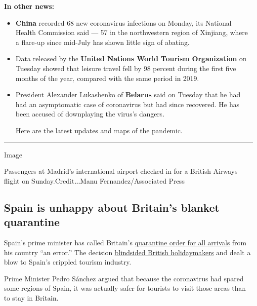 \textbf{In other news:}

\begin{itemize}
\item
  \textbf{China} recorded 68 new coronavirus infections on Monday, its
  National Health Commission said --- 57 in the northwestern region of
  Xinjiang, where a flare-up since mid-July has shown little sign of
  abating.
\item
  Data released by the \textbf{United Nations World Tourism
  Organization} on Tuesday showed that leisure travel fell by 98 percent
  during the first five months of the year, compared with the same
  period in 2019.
\item
  President Alexander Lukashenko of \textbf{Belarus} said on Tuesday
  that he had had an asymptomatic case of coronavirus but had since
  recovered. He has been accused of downplaying the virus's dangers.

  Here are
  \href{https://www.nytimes.com/2020/07/28/world/coronavirus-covid-19.html}{the
  latest updates} and
  \href{https://www.nytimes.com/interactive/2020/world/coronavirus-maps.html}{maps
  of the pandemic}.
\end{itemize}

\begin{center}\rule{0.5\linewidth}{\linethickness}\end{center}

Image

Passengers at Madrid's international airport checked in for a British
Airways flight on Sunday.Credit...Manu Fernandez/Associated Press

\hypertarget{spain-is-unhappy-about-britains-blanket-quarantine}{%
\subsection{Spain is unhappy about Britain's blanket
quarantine}\label{spain-is-unhappy-about-britains-blanket-quarantine}}

Spain's prime minister has called Britain's
\href{https://www.nytimes.com/2020/07/28/world/europe/spain-britain-quarantine-order.html}{quarantine
order for all arrivals} from his country ``an error.'' The decision
\href{https://www.nytimes.com/2020/07/26/world/europe/Spain-quarantine-UK-travel.html}{blindsided
British holidaymakers} and dealt a blow to Spain's crippled tourism
industry.

Prime Minister Pedro Sánchez argued that because the coronavirus had
spared some regions of Spain, it was actually safer for tourists to
visit those areas than to stay in Britain.

